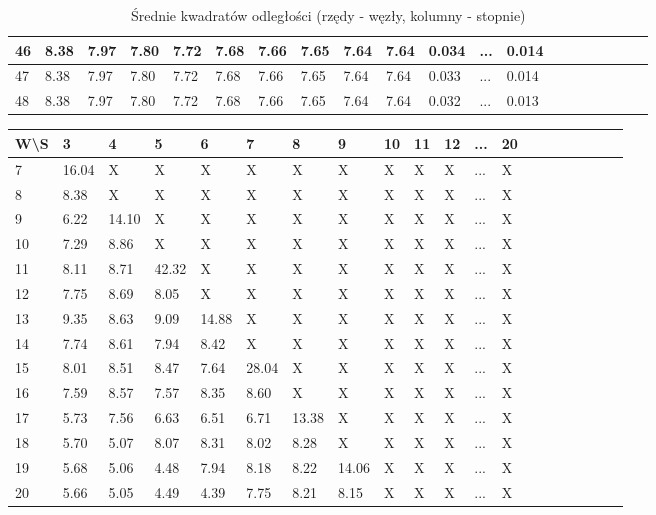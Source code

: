 \documentclass{article}
\begin{document}
\begin{table}[H]
\begin{adjustwidth}{-.7in}{-.7in}
\begin{tabular}{|l|l|l|l|l|l|l|l|l|l|l|l|l|l|l|l|l|l|l|l|}
46 & 8.38 & 7.97 & 7.80 & 7.72 & 7.68 & 7.66 & 7.65 & 7.64 & 7.64 & 0.034 & ... & 0.014 \\ \hline
47 & 8.38 & 7.97 & 7.80 & 7.72 & 7.68 & 7.66 & 7.65 & 7.64 & 7.64 & 0.033 & ... & 0.014 \\ \hline
48 & 8.38 & 7.97 & 7.80 & 7.72 & 7.68 & 7.66 & 7.65 & 7.64 & 7.64 & 0.032 & ... & 0.013 \\ \hline
\end{tabular}
\end{adjustwidth}
\caption{Średnie kwadratów odległości (rzędy - węzły, kolumny - stopnie)}
\end{table}

\begin{table}[H]
\begin{adjustwidth}{-.6in}{-.6in} 
\begin{tabular}{|l|l|l|l|l|l|l|l|l|l|l|l|l|l|l|l|l|l|l|l|}
\hline
W\textbackslash{}S & 3 & 4 & 5 & 6 & 7 & 8 & 9 & 10 & 11 & 12 & ... & 20 \\ \hline
7 & 16.04 & X & X & X & X & X & X & X & X & X & ... & X \\ \hline
8 & 8.38 & X & X & X & X & X & X & X & X & X & ... & X \\ \hline
9 & 6.22 & 14.10 & X & X & X & X & X & X & X & X & ... & X \\ \hline
10 & 7.29 & 8.86 & X & X & X & X & X & X & X & X & ... & X \\ \hline
11 & 8.11 & 8.71 & 42.32 & X & X & X & X & X & X & X & ... & X \\ \hline
12 & 7.75 & 8.69 & 8.05 & X & X & X & X & X & X & X & ... & X \\ \hline
13 & 9.35 & 8.63 & 9.09 & 14.88 & X & X & X & X & X & X & ... & X \\ \hline
14 & 7.74 & 8.61 & 7.94 & 8.42 & X & X & X & X & X & X & ... & X \\ \hline
15 & 8.01 & 8.51 & 8.47 & 7.64 & 28.04 & X & X & X & X & X & ... & X \\ \hline
16 & 7.59 & 8.57 & 7.57 & 8.35 & 8.60 & X & X & X & X & X & ... & X \\ \hline
17 & 5.73 & 7.56 & 6.63 & 6.51 & 6.71 & 13.38 & X & X & X & X & ... & X \\ \hline
18 & 5.70 & 5.07 & 8.07 & 8.31 & 8.02 & 8.28 & X & X & X & X & ... & X \\ \hline
19 & 5.68 & 5.06 & 4.48 & 7.94 & 8.18 & 8.22 & 14.06 & X & X & X & ... & X \\ \hline
20 & 5.66 & 5.05 & 4.49 & 4.39 & 7.75 & 8.21 & 8.15 & X & X & X & ... & X \\ \hline

\end{tabular}
\end{adjustwidth}
\end{table}
\end{document}
